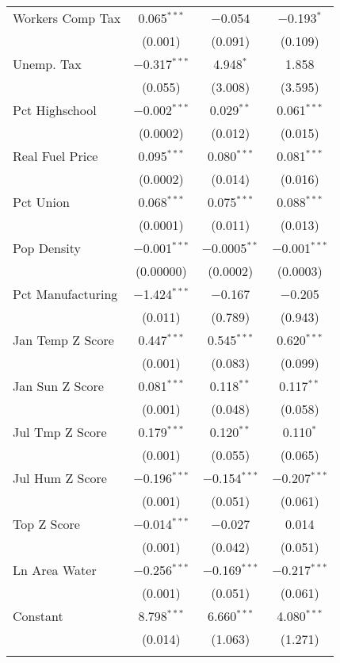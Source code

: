 \begin{table}[!htbp]
\begin{tabular}{@{\extracolsep{5pt}}lccc}
  Workers Comp Tax & 0.065$^{***}$ & $-$0.054 & $-$0.193$^{*}$ \\ 
  & (0.001) & (0.091) & (0.109) \\ 
  Unemp. Tax & $-$0.317$^{***}$ & 4.948$^{*}$ & 1.858 \\ 
  & (0.055) & (3.008) & (3.595) \\ 
  Pct Highschool & $-$0.002$^{***}$ & 0.029$^{**}$ & 0.061$^{***}$ \\ 
  & (0.0002) & (0.012) & (0.015) \\ 
  Real Fuel Price & 0.095$^{***}$ & 0.080$^{***}$ & 0.081$^{***}$ \\ 
  & (0.0002) & (0.014) & (0.016) \\ 
  Pct Union & 0.068$^{***}$ & 0.075$^{***}$ & 0.088$^{***}$ \\ 
  & (0.0001) & (0.011) & (0.013) \\ 
  Pop Density & $-$0.001$^{***}$ & $-$0.0005$^{**}$ & $-$0.001$^{***}$ \\ 
  & (0.00000) & (0.0002) & (0.0003) \\ 
  Pct Manufacturing & $-$1.424$^{***}$ & $-$0.167 & $-$0.205 \\ 
  & (0.011) & (0.789) & (0.943) \\ 
  Jan Temp Z Score & 0.447$^{***}$ & 0.545$^{***}$ & 0.620$^{***}$ \\ 
  & (0.001) & (0.083) & (0.099) \\ 
  Jan Sun Z Score & 0.081$^{***}$ & 0.118$^{**}$ & 0.117$^{**}$ \\ 
  & (0.001) & (0.048) & (0.058) \\ 
  Jul Tmp Z Score & 0.179$^{***}$ & 0.120$^{**}$ & 0.110$^{*}$ \\ 
  & (0.001) & (0.055) & (0.065) \\ 
  Jul Hum Z Score & $-$0.196$^{***}$ & $-$0.154$^{***}$ & $-$0.207$^{***}$ \\ 
  & (0.001) & (0.051) & (0.061) \\ 
  Top Z Score & $-$0.014$^{***}$ & $-$0.027 & 0.014 \\ 
  & (0.001) & (0.042) & (0.051) \\ 
  Ln Area Water & $-$0.256$^{***}$ & $-$0.169$^{***}$ & $-$0.217$^{***}$ \\ 
  & (0.001) & (0.051) & (0.061) \\ 
  Constant & 8.798$^{***}$ & 6.660$^{***}$ & 4.080$^{***}$ \\ 
  & (0.014) & (1.063) & (1.271) \\ 
 \hline \\[-1.8ex] 

\end{tabular}
\end{table}
